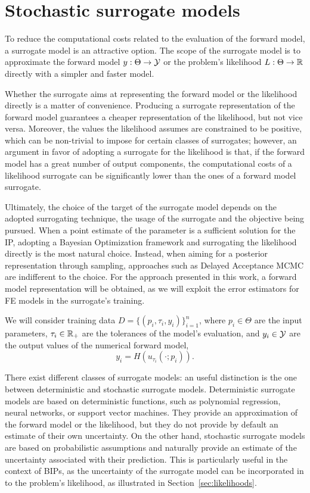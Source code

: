 \section{Stochastic surrogate models}\label{sec:surrogates}
To reduce the computational costs related to the evaluation of the forward model, a surrogate model is an attractive option.
The scope of the surrogate model is to approximate the forward model $y : \Theta \rightarrow \mathcal Y $ or the problem's likelihood $L: \Theta \rightarrow \mathbb{R} $ directly with a simpler and faster model.\medbreak

Whether the surrogate aims at representing the forward model or the likelihood directly is a matter of convenience.
Producing a surrogate representation of the forward model guarantees a cheaper representation of the likelihood, but not vice versa. Moreover, the values the likelihood assumes are constrained to be positive, which can be non-trivial to impose for certain classes of surrogates; however, an argument in favor of adopting a surrogate for the likelihood is that, if the forward model has a great number of output components, the computational costs of a likelihood surrogate can be significantly lower than the ones of a forward model surrogate.

Ultimately, the choice of the target of the surrogate model depends on the adopted surrogating technique, the usage of the surrogate and the objective being pursued.
When a point estimate of the parameter is a sufficient solution for the IP, adopting a Bayesian Optimization framework and surrogating the likelihood directly is the most natural choice.
Instead, when aiming for a posterior representation through sampling, approaches such as Delayed Acceptance MCMC \cite{ChristenFox2005} are indifferent to the choice.
For the approach presented in this work, a forward model representation will be obtained, as we will exploit the error estimators for FE models in the surrogate's training. \medbreak

We will consider training data $ D =\{ (p_i, \tau_i, y_i) \}_{i=1}^n $, where $ p_i \in \Theta $ are the input parameters, $ \tau_i \in \mathbb{R}_+ $ are the tolerances of the model's evaluation, and $ y_i \in \mathcal Y $ are the output values of the numerical forward model,\[ y_i = H(u_{\tau_i}(\cdot; p_i)). \]

There exist different classes of surrogate models: an useful distinction is the one between deterministic and stochastic surrogate models.
Deterministic surrogate models are based on deterministic functions, such as polynomial regression, neural networks, or support vector machines.
They provide an approximation of the forward model or the likelihood, but they do not provide by default an estimate of their own uncertainty.
On the other hand, stochastic surrogate models are based on probabilistic assumptions and naturally provide an estimate of the uncertainty associated with their prediction.
This is particularly useful in the context of BIPs, as the uncertainty of the surrogate model can be incorporated in to the problem's likelihood, as illustrated in Section~\ref{sec:likelihoods}. \medbreak

